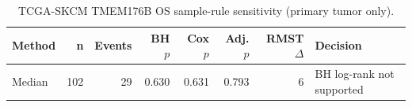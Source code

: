 \begin{table}[t]
\centering
\caption{TCGA-SKCM TMEM176B OS sample-rule sensitivity (primary tumor only).}
\label{tab:skcm-tmem176b-os-primary-tumor-only}
\begin{tabular}{lrrrrrrl}
\toprule
Method & n & Events & BH $p$ & Cox $p$ & Adj. $p$ & RMST $\Delta$ & Decision \\
\midrule
Median & 102 & 29 & 0.630 & 0.631 & 0.793 & 6 & BH log-rank not supported \\
\bottomrule
\end{tabular}
\end{table}
